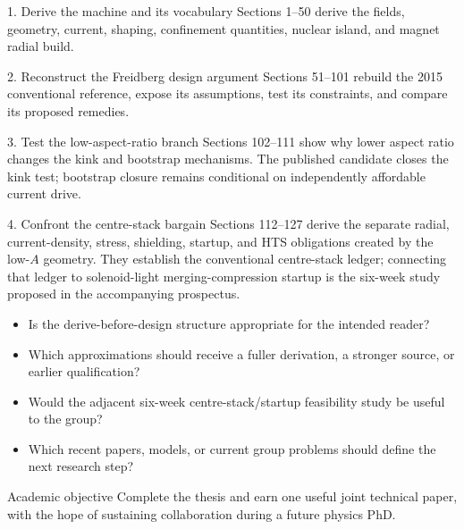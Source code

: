 \documentclass[11pt]{article}
\newcommand{\heading}[1]{\vspace{10pt}{\large\bfseries\color{navy}#1}\par\vspace{2pt}}
\begin{document}
\begin{mapbox}{1. Derive the machine and its vocabulary}
Sections 1--50 derive the fields, geometry, current, shaping, confinement quantities, nuclear island, and
magnet radial build.
\end{mapbox}

\begin{mapbox}{2. Reconstruct the Freidberg design argument}
Sections 51--101 rebuild the 2015 conventional reference, expose its assumptions, test its constraints, and
compare its proposed remedies.
\end{mapbox}

\begin{mapbox}{3. Test the low-aspect-ratio branch}
Sections 102--111 show why lower aspect ratio changes the kink and bootstrap mechanisms. The published
candidate closes the kink test; bootstrap closure remains conditional on independently affordable current drive.
\end{mapbox}

\begin{mapbox}{4. Confront the centre-stack bargain}
Sections 112--127 derive the separate radial, current-density, stress, shielding, startup, and HTS obligations
created by the low-$A$ geometry. They establish the conventional centre-stack ledger; connecting that ledger to
solenoid-light merging-compression startup is the six-week study proposed in the accompanying prospectus.
\end{mapbox}

\heading{Questions for discussion}
\begin{itemize}
  \item Is the derive-before-design structure appropriate for the intended reader?
  \item Which approximations should receive a fuller derivation, a stronger source, or earlier qualification?
  \item Would the adjacent six-week centre-stack/startup feasibility study be useful to the group?
  \item Which recent papers, models, or current group problems should define the next research step?
\end{itemize}

\begin{goldbox}{Academic objective}
Complete the thesis and earn one useful joint technical paper, with the hope of sustaining collaboration
during a future physics PhD.
\end{goldbox}

\clearpage


\end{document}
